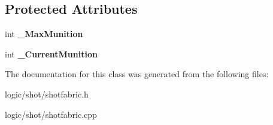 \subsection*{Protected Attributes}
\begin{DoxyCompactItemize}
\item 
\hypertarget{class_shot_fabric_a89ed1c6e673c23fa50018dd06d867a66}{int {\bfseries \-\_\-\-Max\-Munition}}\label{class_shot_fabric_a89ed1c6e673c23fa50018dd06d867a66}

\item 
\hypertarget{class_shot_fabric_a5863cbc4e51a089b3e87a1afd77629ba}{int {\bfseries \-\_\-\-Current\-Munition}}\label{class_shot_fabric_a5863cbc4e51a089b3e87a1afd77629ba}

\end{DoxyCompactItemize}


The documentation for this class was generated from the following files\-:\begin{DoxyCompactItemize}
\item 
logic/shot/shotfabric.\-h\item 
logic/shot/shotfabric.\-cpp\end{DoxyCompactItemize}
